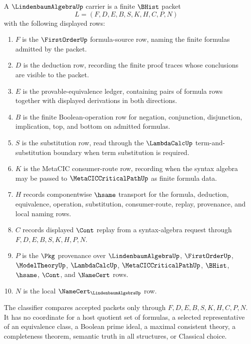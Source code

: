 \begin{definition}
\label{def:lindenbaum-algebra-carrier}
A $\LindenbaumAlgebraUp$ carrier is a finite $\BHist$ packet
$$
L=(F,D,E,B,S,K,H,C,P,N)
$$
with the following displayed rows:
\begin{enumerate}
\item $F$ is the $\FirstOrderUp$ formula-source row, naming the finite formulas admitted by the packet.
\item $D$ is the deduction row, recording the finite proof traces whose conclusions are visible to the packet.
\item $E$ is the provable-equivalence ledger, containing pairs of formula rows together with displayed derivations in both directions.
\item $B$ is the finite Boolean-operation row for negation, conjunction, disjunction, implication, top, and bottom on admitted formulas.
\item $S$ is the substitution row, read through the $\LambdaCalcUp$ term-and-substitution boundary when term substitution is required.
\item $K$ is the MetaCIC consumer-route row, recording when the syntax algebra may be passed to $\MetaCICCriticalPathUp$ as finite formula data.
\item $H$ records componentwise $\hsame$ transport for the formula, deduction, equivalence, operation, substitution, consumer-route, replay, provenance, and local naming rows.
\item $C$ records displayed $\Cont$ replay from a syntax-algebra request through $F,D,E,B,S,K,H,P,N$.
\item $P$ is the $\Pkg$ provenance over $\LindenbaumAlgebraUp$, $\FirstOrderUp$, $\ModelTheoryUp$, $\LambdaCalcUp$, $\MetaCICCriticalPathUp$, $\BHist$, $\hsame$, $\Cont$, and $\NameCert$ rows.
\item $N$ is the local $\NameCert_{\LindenbaumAlgebraUp}$ row.
\end{enumerate}
The classifier compares accepted packets only through $F,D,E,B,S,K,H,C,P,N$. It has no coordinate for a host quotient set of formulas, a selected representative of an equivalence class, a Boolean prime ideal, a maximal consistent theory, a completeness theorem, semantic truth in all structures, or Classical choice.
\end{definition}

